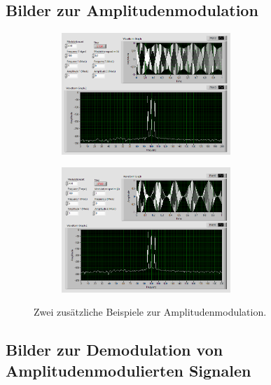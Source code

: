 \subsection{Bilder zur Amplitudenmodulation}
\pagestyle{headings}
\begin{figure}[H]
	\centering
	\begin{subfigure}[c]{\textwidth}
		\centering
		\includegraphics[width=0.7\textwidth]{pic/am_anhang_1.png}
	\end{subfigure}
	\begin{subfigure}[c]{\textwidth}
		\centering
		\includegraphics[width=0.7\textwidth]{pic/am_anhang_2.png}
	\end{subfigure}	
	\caption{Zwei zusätzliche Beispiele zur Amplitudenmodulation.}
	\label{fig:a1}	
\end{figure}

\subsection{Bilder zur Demodulation von Amplitudenmodulierten Signalen}

